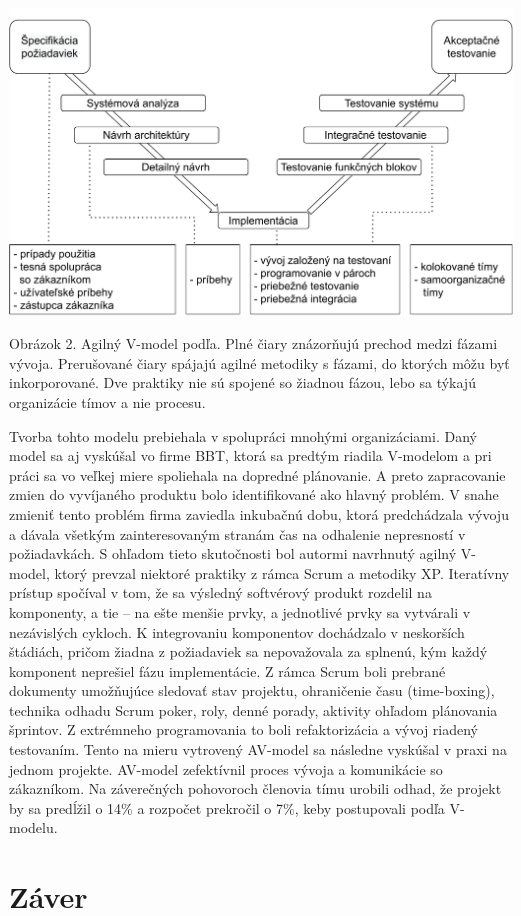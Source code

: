 \documentclass[10pt,twoside,slovak,a4paper]{article}
\begin{document}
\includegraphics[scale=0.5]{avmodel.pdf}

Obrázok 2. Agilný V-model podľa\cite{mchugh2013}. Plné čiary znázorňujú prechod medzi fázami vývoja. Prerušované čiary spájajú agilné metodiky s fázami, do ktorých môžu byť inkorporované. Dve praktiky nie sú spojené so žiadnou fázou, lebo sa týkajú organizácie tímov a nie procesu.
\medskip

Tvorba tohto modelu prebiehala v spolupráci mnohými organizáciami. Daný model sa aj vyskúšal vo firme BBT, ktorá sa predtým riadila V-modelom a pri práci sa vo veľkej miere spoliehala na dopredné plánovanie. A preto zapracovanie zmien do vyvíjaného produktu bolo identifikované ako hlavný problém. V snahe zmieniť tento problém firma zaviedla inkubačnú dobu, ktorá predchádzala vývoju a dávala všetkým zainteresovaným stranám čas na odhalenie nepresností v požiadavkách. S ohľadom tieto skutočnosti bol autormi navrhnutý agilný V-model, ktorý prevzal niektoré praktiky z rámca Scrum a metodiky XP. Iteratívny prístup spočíval v tom, že sa výsledný softvérový produkt rozdelil na komponenty, a tie – na ešte menšie prvky, a jednotlivé prvky sa vytvárali v nezávislých cykloch. K integrovaniu komponentov dochádzalo v neskorších štádiách, pričom žiadna z požiadaviek sa nepovažovala za splnenú, kým každý komponent neprešiel fázu implementácie. Z rámca Scrum boli prebrané dokumenty umožňujúce sledovať stav projektu, ohraničenie času (time-boxing), technika odhadu Scrum poker, roly, denné porady, aktivity ohľadom plánovania šprintov. Z extrémneho programovania to boli refaktorizácia a vývoj riadený testovaním. Tento na mieru vytrovený AV-model sa následne vyskúšal v praxi na jednom projekte. AV-model zefektívnil proces vývoja a komunikácie so zákazníkom. Na záverečných pohovoroch členovia tímu urobili odhad, že projekt by sa predĺžil o 14\% a rozpočet prekročil o 7\%, keby postupovali podľa V-modelu.

\section{Záver}


\end{document}
